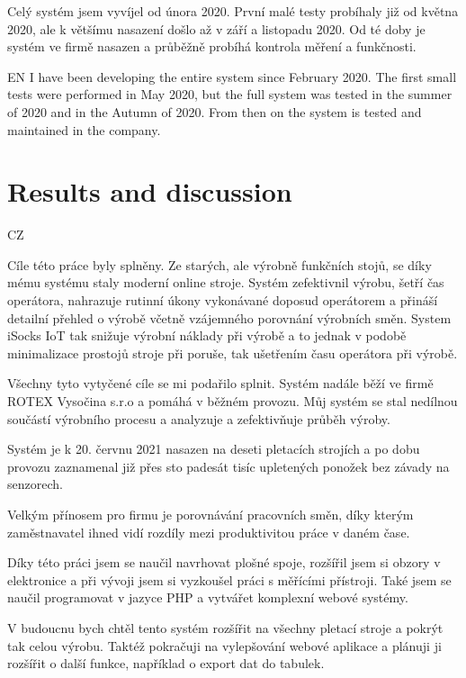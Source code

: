 \documentclass[12pt, a4paper]{article}
\begin{document}
Celý systém jsem vyvíjel od února 2020.
První malé testy probíhaly již od května 2020, ale k většímu nasazení došlo až v září a listopadu 2020.
Od té doby je systém ve firmě nasazen a průběžně probíhá kontrola měření a funkčnosti.

EN
I have been developing the entire system since February 2020.
The first small tests were performed in May 2020, but the full system was tested in the summer of 2020 and in the Autumn of 2020.
From then on the system is tested and maintained in the company.


\newpage
\section*{Results and discussion}

CZ

Cíle této práce byly splněny. Ze starých, ale výrobně funkčních stojů, se díky mému systému staly moderní online stroje.
Systém zefektivnil výrobu, šetří čas operátora, nahrazuje rutinní úkony vykonávané doposud operátorem a přináší detailní přehled o výrobě včetně vzájemného porovnání výrobních směn.
System iSocks IoT tak snižuje výrobní náklady při výrobě a to jednak v podobě minimalizace prostojů stroje při poruše, tak ušetřením času operátora při výrobě.


Všechny tyto vytyčené cíle se mi podařilo splnit.
Systém nadále běží ve firmě ROTEX Vysočina s.r.o a pomáhá v běžném provozu.
Můj systém se stal nedílnou součástí výrobního procesu a analyzuje a zefektivňuje průběh výroby.

Systém je k 20. červnu 2021 nasazen na deseti pletacích strojích a po dobu provozu zaznamenal již přes sto padesát tisíc upletených ponožek bez závady na senzorech.

Velkým přínosem pro firmu je porovnávání pracovních směn, díky kterým zaměstnavatel ihned vidí rozdíly mezi produktivitou práce v daném čase.

Díky této práci jsem se naučil navrhovat plošné spoje, rozšířil jsem si obzory v elektronice a při vývoji jsem si vyzkoušel práci s měřícími přístroji.
Také jsem se naučil programovat v jazyce PHP a vytvářet komplexní webové systémy.

V budoucnu bych chtěl tento systém rozšířit na všechny pletací stroje a pokrýt tak celou výrobu.
Taktéž pokračuji na vylepšování webové aplikace a plánuji ji rozšířit o další funkce, například o export dat do tabulek.
\end{document}
